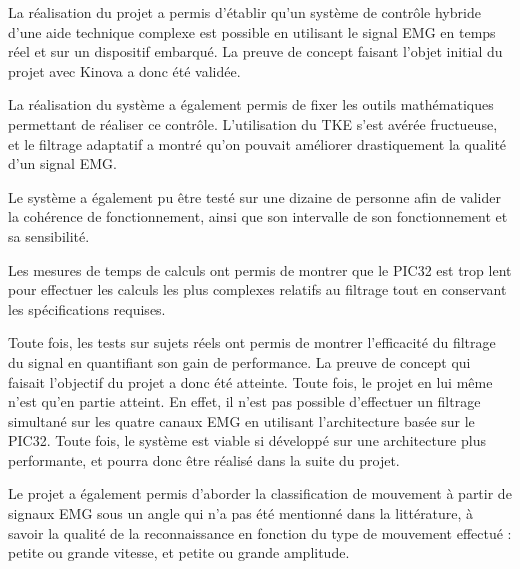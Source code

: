 \documentclass[letterpaper, twoside, 12pt, memoire, creativecommons, hyperref]{thETS}
\begin{document}
\begin{conclusion}

La réalisation du projet a permis d'établir qu'un système de contrôle hybride d'une aide technique complexe est possible en utilisant le signal EMG en temps réel et sur un dispositif embarqué. La preuve de concept faisant l'objet initial du projet avec Kinova a donc été validée. 

La réalisation du système a également permis de fixer les outils mathématiques permettant de réaliser ce contrôle. L'utilisation du TKE s'est avérée fructueuse, et le filtrage adaptatif a montré qu'on pouvait améliorer drastiquement la qualité d'un signal EMG. 

Le système a également pu être testé sur une dizaine de personne afin de valider la cohérence de fonctionnement, ainsi que son intervalle de son fonctionnement et sa sensibilité.

Les mesures de temps de calculs ont permis de montrer que le PIC32 est trop lent pour effectuer les calculs les plus complexes relatifs au filtrage tout en conservant les spécifications requises. 

Toute fois, les tests sur sujets réels ont permis de montrer l'efficacité du filtrage du signal en quantifiant son gain de performance. La preuve de concept qui faisait l'objectif du projet a donc été atteinte. Toute fois, le projet en lui même n'est qu'en partie atteint. En effet, il n'est pas possible d'effectuer un filtrage simultané sur les quatre canaux EMG en utilisant l'architecture basée sur le PIC32. Toute fois, le système est viable si développé sur une architecture plus performante, et pourra donc être réalisé dans la suite du projet.

Le projet a également permis d'aborder la classification de mouvement à partir de signaux EMG sous un angle qui n'a pas été mentionné dans la littérature, à savoir la qualité de la reconnaissance en fonction du type de mouvement effectué : petite ou grande vitesse, et petite ou grande amplitude.

\end{conclusion}
\end{document}
